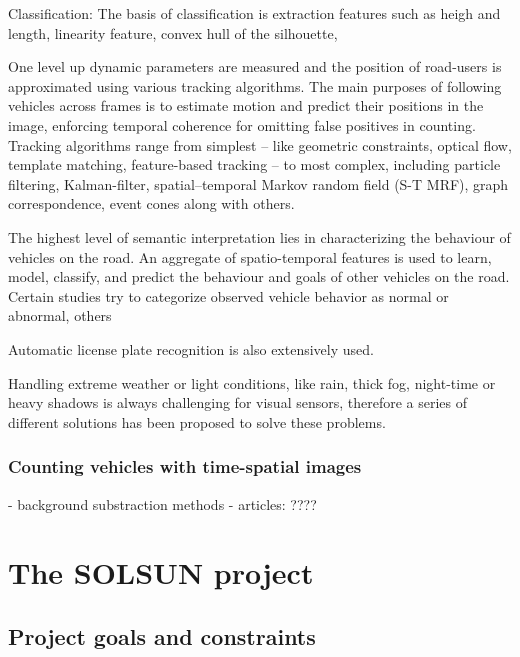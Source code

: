 Classification:
The basis of classification is extraction features such as heigh and length\cite{}, linearity feature\cite{}, convex hull of the
silhouette\cite{},

One level up dynamic parameters are measured and the position of road-users is approximated using various tracking algorithms. 
The main purposes of following vehicles across frames is to estimate  motion and predict their positions in the image, enforcing temporal coherence for omitting false positives in counting.
Tracking algorithms range from simplest -- like geometric constraints\cite{Rabe2007}, optical flow\cite{Bhaskar2015}, template matching\cite{Liu2007}, feature-based tracking\cite{Haselhoff2009} -- to most complex, including particle filtering\cite{Danescu2011}, Kalman-filter\cite{Bresson2015}, spatial–temporal Markov random field (S-T MRF)\cite{Zhu2005}, graph correspondence\cite{Lai2010}, event cones\cite{Andrienko2015} along with others. 

The highest level of semantic interpretation lies in characterizing the behaviour of vehicles on the road\cite{Sivaraman2013}.
An aggregate of spatio-temporal features is used to learn, model, classify, and predict the behaviour and goals of other vehicles on the road.
Certain studies try to categorize observed vehicle behavior as normal or abnormal, others 

Automatic license plate recognition is also extensively used\cite{Luvizon2016, Sivaraman2013}. 


Handling extreme weather or light conditions, like rain, thick fog, night-time or heavy shadows is always challenging for visual sensors, therefore a series of different solutions has been proposed to solve these problems.


\subsubsection{Counting vehicles with time-spatial images}
- background substraction methods
- articles: ????

\section{The SOLSUN project}
\subsection{Project goals and constraints}

